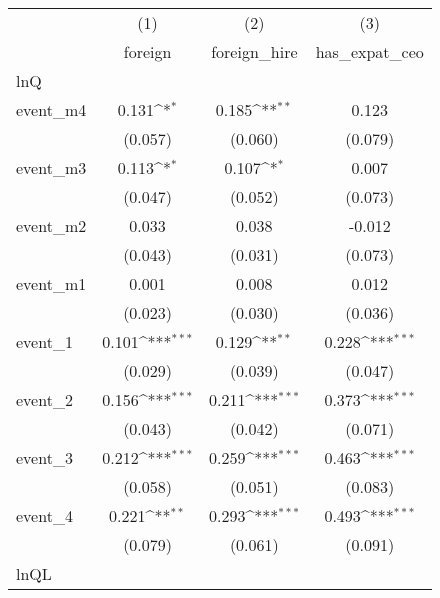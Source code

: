 {
\def\sym#1{\ifmmode^{#1}\else\(^{#1}\)\fi}
\begin{tabular}{l*{3}{c}}
\hline\hline
            &\multicolumn{1}{c}{(1)}&\multicolumn{1}{c}{(2)}&\multicolumn{1}{c}{(3)}\\
            &\multicolumn{1}{c}{foreign}&\multicolumn{1}{c}{foreign\_hire}&\multicolumn{1}{c}{has\_expat\_ceo}\\
\hline
lnQ         &                     &                     &                     \\
event\_m4    &       0.131\sym{*}  &       0.185\sym{**} &       0.123         \\
            &     (0.057)         &     (0.060)         &     (0.079)         \\
[1em]
event\_m3    &       0.113\sym{*}  &       0.107\sym{*}  &       0.007         \\
            &     (0.047)         &     (0.052)         &     (0.073)         \\
[1em]
event\_m2    &       0.033         &       0.038         &      -0.012         \\
            &     (0.043)         &     (0.031)         &     (0.073)         \\
[1em]
event\_m1    &       0.001         &       0.008         &       0.012         \\
            &     (0.023)         &     (0.030)         &     (0.036)         \\
[1em]
event\_1     &       0.101\sym{***}&       0.129\sym{**} &       0.228\sym{***}\\
            &     (0.029)         &     (0.039)         &     (0.047)         \\
[1em]
event\_2     &       0.156\sym{***}&       0.211\sym{***}&       0.373\sym{***}\\
            &     (0.043)         &     (0.042)         &     (0.071)         \\
[1em]
event\_3     &       0.212\sym{***}&       0.259\sym{***}&       0.463\sym{***}\\
            &     (0.058)         &     (0.051)         &     (0.083)         \\
[1em]
event\_4     &       0.221\sym{**} &       0.293\sym{***}&       0.493\sym{***}\\
            &     (0.079)         &     (0.061)         &     (0.091)         \\
\hline
lnQL        &                     &                     &                     \\

\end{tabular}}
